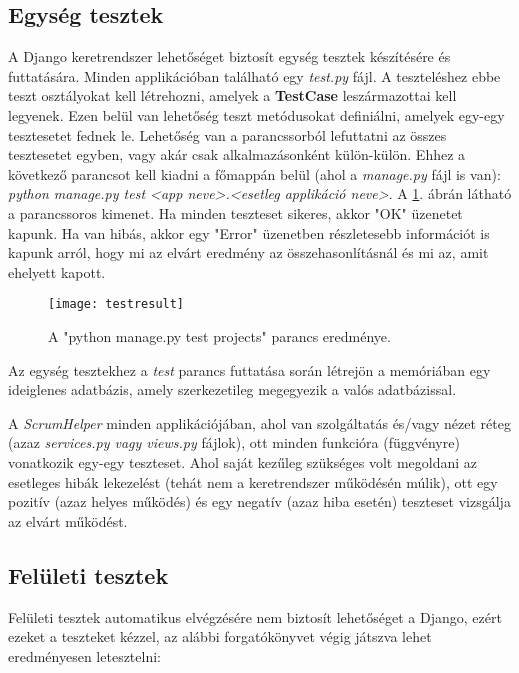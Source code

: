 \subsection{Egység tesztek}

A Django keretrendszer lehetőséget biztosít egység tesztek készítésére és futtatására. Minden applikációban található egy \textit{test.py} fájl. A teszteléshez ebbe teszt osztályokat kell létrehozni, amelyek a \textbf{TestCase} leszármazottai kell legyenek. Ezen belül van lehetőség teszt metódusokat definiálni, amelyek egy-egy tesztesetet fednek le. Lehetőség van a parancssorból lefuttatni az összes tesztesetet egyben, vagy akár csak alkalmazásonként külön-külön. Ehhez a következő parancsot kell kiadni a főmappán belül (ahol a \textit{manage.py} fájl is van): \textit{python manage.py test <app neve>.<esetleg applikáció neve>}. A \ref{fig:tests}. ábrán látható a parancssoros kimenet. Ha minden teszteset sikeres, akkor "OK" üzenetet kapunk. Ha van hibás, akkor egy "Error" üzenetben részletesebb információt is kapunk arról, hogy mi az elvárt eredmény az összehasonlításnál és mi az, amit ehelyett kapott.

\begin{figure}[H]
	\centering
	\texttt{[image: testresult]}
	\caption{A "python manage.py test projects" parancs eredménye.}
	\label{fig:tests}
\end{figure}

Az egység tesztekhez a \textit{test} parancs futtatása során létrejön a memóriában egy ideiglenes adatbázis, amely szerkezetileg megegyezik a valós adatbázissal. 

A \textit{ScrumHelper} minden applikációjában, ahol van szolgáltatás és/vagy nézet réteg (azaz \textit{services.py vagy views.py} fájlok), ott minden funkcióra (függvényre) vonatkozik egy-egy teszteset. Ahol saját kezűleg szükséges volt megoldani az esetleges hibák lekezelést (tehát nem a keretrendszer működésén múlik), ott egy pozitív (azaz helyes működés) és egy negatív (azaz hiba esetén) teszteset vizsgálja az elvárt működést.

\subsection{Felületi tesztek}

Felületi tesztek automatikus elvégzésére nem biztosít lehetőséget a Django, ezért ezeket a teszteket kézzel, az alábbi forgatókönyvet végig játszva lehet eredményesen letesztelni:

